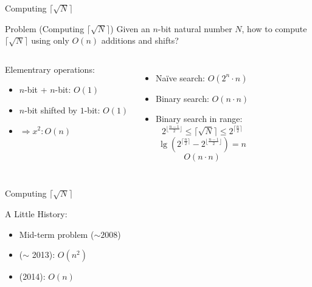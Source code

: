 \documentclass{beamer}
\begin{document}
\begin{frame}{Computing $\lceil \sqrt{N} \rceil$}
  \begin{exampleblock}{Problem (Computing $\lceil \sqrt{N} \rceil$)}
    Given an $n$-bit natural number $N$, how to compute $\lceil \sqrt{N} \rceil$
    using only $O(n)$ additions and shifts?
  \end{exampleblock}

  \vspace{0.50cm}
  \begin{columns}
	  \begin{block}{Elementrary operations:}
	    \begin{itemize}
	      \item $n$-bit + $n$-bit: $O(1)$
	      \item $n$-bit shifted by $1$-bit: $O(1)$
	      \item $\Rightarrow x^2: O(n)$
	    \end{itemize}
	  \end{block}
	  \begin{itemize}
	    \item Na{\"i}ve search: $O(2^{n} \cdot n)$
	    \item Binary search: $O(n \cdot n)$
	    \item Binary search in range:
	    \[
	      2^{\lfloor \frac{n-1}{2} \rfloor} \le \lceil \sqrt{N} \rceil \le
	      2^{\lceil \frac{n}{2} \rceil}
	    \]
	    \[
	      \lg{(2^{\lceil \frac{n}{2} \rceil} - 2^{\lfloor
	      \frac{n-1}{2} \rfloor})} = n
	    \]
	    \[ O(n \cdot n) \]
	  \end{itemize}
  \end{columns}
\end{frame}
\begin{frame}{Computing $\lceil \sqrt{N} \rceil$}
  \begin{block}{A Little History:}
    \begin{itemize}
      \item Mid-term problem ($\sim 2008$)
      \item ($\sim$ 2013): $O(n^2)$
      \item (2014): $O(n)$
    \end{itemize}
  \end{block}
\end{frame}
\end{document}
